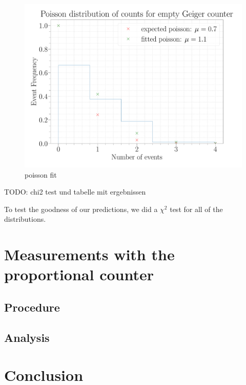 \begin{figure}[H]
\centering
\includegraphics[width=\textwidth]{../Figures/Geiger_poisson_fit.pdf}
\caption{poisson fit}
\label{fig:PoissonFit}
\end{figure}

TODO: chi2 test und tabelle mit ergebnissen

To test the goodness of our predictions, we did a $\chi^2$ test for all of the distributions.  

\section{Measurements with the proportional counter}

\subsection{Procedure}

\subsection{Analysis}

\section{Conclusion}




